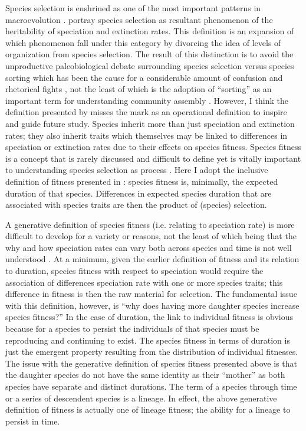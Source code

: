 Species selection is enshrined as one of the most important patterns in macroevolution \citep{Stanley1975,Stanley1979,Vrba1986,Jablonski2008a,Rabosky2010b,Simpson2016a,Pennell2014}. \citet{Rabosky2010b} portray species selection as resultant phenomenon of the heritability of speciation and extinction rates. This definition is an expansion of which phenomenon fall under this category by divorcing the idea of levels of organization from species selection. The result of this distinction is to avoid the unproductive paleobiological debate surrounding species selection versus species sorting which has been the cause for a considerable amount of confusion and rhetorical fights \citep{Vrba1984a,Vrba1986,Lloyd1993,Pennell2014}, not the least of which is the adoption of ``sorting'' as an important term for understanding community assembly \citep{Urban2008,Loeuille2008,Holt2006,Cottenie2005,Soininen2014,VanderGucht2007,Shipley2006}. However, I think the definition presented by \citet{Rabosky2010b} misses the mark as an operational definition to inspire and guide future study. Species inherit more than just speciation and extinction rates; they also inherit traits which themselves may be linked to differences in speciation or extinction rates due to their effects on species fitness. Species fitness is a concept that is rarely discussed and difficult to define yet is vitally important to understanding species selection as process \citep{Cooper1984,Palmer2012}. Here I adopt the inclusive definition of fitness presented in \citet{Cooper1984}: species fitness is, minimally, the expected duration of that species. Differences in expected species duration that are associated with species traits are then the product of (species) selection.

A generative definition of species fitness (i.e. relating to speciation rate) is more difficult to develop for a variety or reasons, not the least of which being that the why and how speciation rates can vary both across species and time is not well understood \citep{Rabosky2015c,Rabosky2013e,Coyne2004}. At a minimum, given the earlier definition of fitness and its relation to duration, species fitness with respect to speciation would require the association of differences speciation rate with one or more species traits; this difference in fitness is then the raw material for selection. The fundamental issue with this definition, however, is ``why does having more daughter species increase species fitness?'' In the case of duration, the link to individual fitness is obvious because for a species to persist the individuals of that species must be reproducing and continuing to exist. The species fitness in terms of duration is just the emergent property resulting from the distribution of individual fitnesses. The issue with the generative definition of species fitness presented above is that the daughter species do not have the same identity as their ``mother'' as both species have separate and distinct durations. The term of a species through time or a series of descendent species is a lineage. In effect, the above generative definition of fitness is actually one of lineage fitness; the ability for a lineage to persist in time.

